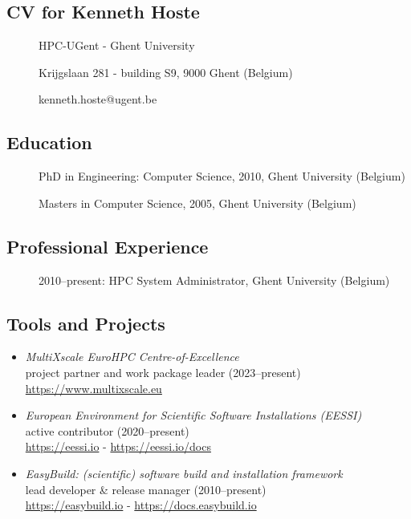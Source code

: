 
\subsection{CV for Kenneth Hoste}
\begin{description}
\item[] HPC-UGent - Ghent University
\item[] Krijgslaan 281 - building S9, 9000 Ghent (Belgium)
\item[] kenneth.hoste@ugent.be
\end{description}

\subsection*{Education}
\begin{description}
    \item[] PhD in Engineering: Computer Science, 2010, Ghent University (Belgium)
    \item[] Masters in Computer Science, 2005, Ghent University (Belgium)
\end{description}

\subsection*{Professional Experience}
\begin{description}
    \item[] 2010--present: HPC System Administrator, Ghent University (Belgium)
\end{description}

\subsection*{Tools and Projects}

\begin{itemize}
    \item[] \emph{MultiXscale EuroHPC Centre-of-Excellence}
        \\project partner and work package leader (2023--present)
        \\{\small{\url{https://www.multixscale.eu}}}
    \item[] \emph{European Environment for Scientific Software Installations (EESSI)}
        \\active contributor (2020--present)
        \\{\small{\url{https://eessi.io} - \url{https://eessi.io/docs}}}
    \item[] \emph{EasyBuild: (scientific) software build and installation framework}
        \\lead developer \& release manager (2010--present)
        \\{\small{\url{https://easybuild.io} - \url{https://docs.easybuild.io}}}
\end{itemize}

